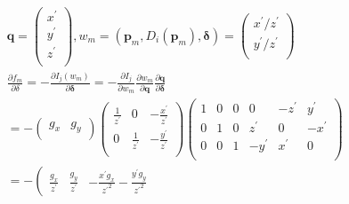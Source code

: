 \documentclass{article}
\begin{document}
\begin{CJK*}{GBK}{song}
\begin{equation}\left.
\begin{aligned}\\&
\boldsymbol{q}=\left(
                 \begin{array}{c}
                   x^{'} \\
                   y^{'} \\
                   z^{'} \\
                 \end{array}
               \right)
,
w_m=(\boldsymbol{p}_m,D_{i}(\boldsymbol{p}_m),\boldsymbol{\delta})=\left(
                 \begin{array}{c}
                   x^{'}/z^{'} \\
                   y^{'}/z^{'} \\
                 \end{array}
               \right)
\\&
\frac{\partial{f_m}}{\partial{\delta}}=-\frac{\partial{I_{j}(w_m)}}{\partial{\boldsymbol{\delta}}}
= -\frac{\partial{I_{j}}}{\partial{w_m}}\frac{\partial{w_m}}{\partial{\boldsymbol{q}}}\frac{\partial{\boldsymbol{q}}}{\partial{\boldsymbol{\delta}}}
\\&
=-\left(
            \begin{array}{cc}
              g_x & g_y \\
            \end{array}
          \right)
          \left(
            \begin{array}{ccc}
              \frac{1}{z^{'}} & 0               & -\frac{x^{'}}{z^{'}} \\
              0               & \frac{1}{z^{'}} & -\frac{y^{'}}{z^{'}} \\
            \end{array}
          \right)
          \left(
            \begin{array}{cccccc}
              1 & 0 & 0 & 0     & -z^{'} & y^{'}  \\
              0 & 1 & 0 & z^{'} & 0      & -x^{'} \\
              0 & 0 & 1 & -y^{'}& x^{'}  & 0      \\
            \end{array}
          \right)
\\&
= -\left(
            \begin{array}{cccccc}
              \frac{g_x}{z^{'}}
              & \frac{g_y}{z^{'}}
              & -\frac{x^{'}g_x}{{z^{'}}^{2}} -\frac{y^{'}g_y}{{z^{'}}^{2}}

\end{array}
\end{aligned}
\end{equation}
\end{CJK*}
\end{document}
